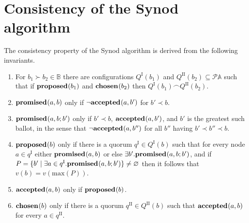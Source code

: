 \documentclass[journal]{IEEEtran}
\begin{document}





\vfill

\pagebreak

\appendices
\section{Consistency of the Synod algorithm}
\label{synod-safety}

The consistency property of the Synod algorithm is derived from the following
invariants.

\begin{enumerate}

\item \label{synod-quorums} For $b_1 \succ b_2 \in \mathbb B$ there are
configurations $Q^\textrm{I}(b_1)$ and $Q^\textrm{II}(b_2) \subseteq \mathcal P
\mathbb A$ such that if $\mathbf{proposed}_{}(b_1)$ and $\mathbf{chosen}_{}(b_2)$ then
${Q^\textrm{I}(b_1) \frown Q^\textrm{II}(b_2)}$.

\item \label{synod-fprom} $\mathbf{promised}_{}(a,b)$ only if $\neg\mathbf{accepted}_{}(a,b')$ for ${b'
\prec b}$.

\item \label{synod-bprom} $\mathbf{promised}_{}(a,b;b')$ only if $b' \prec b$,
$\mathbf{accepted}_{}(a,b')$, and $b'$ is the greatest such ballot, in the sense that
$\neg\mathbf{accepted}_{}(a,b'')$ for all $b''$ having $b' \prec b'' \prec b$.

\item \label{synod-prop} $\mathbf{proposed}_{}(b)$ only if there is a quorum $q^\textrm{I}
\in Q^\textrm{I}(b)$ such that for every node $a \in q^\textrm{I}$ either
$\mathbf{promised}_{}(a,b)$ or else $\exists b'.  \mathbf{promised}_{}(a,b;b')$, and if ${P = \{ b'
\mid \exists a \in q^\textrm{I}. \mathbf{promised}_{}(a,b;b') \} \ne \varnothing}$ then
it follows that $v(b) = v(\mathrm{max}(P))$.

\item \label{synod-acc} $\mathbf{accepted}_{}(a,b)$ only if $\mathbf{proposed}_{}(b)$.

\item \label{synod-chosen} $\mathbf{chosen}_{}(b)$ only if there is a quorum
$q^\textrm{II} \in Q^\textrm{II}(b)$ such that $\mathbf{accepted}_{}(a,b)$ for every $a \in
q^\textrm{II}$.

\end{enumerate}
\end{document}
